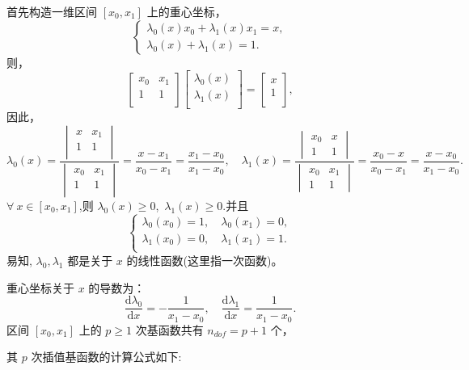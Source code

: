 \documentclass[12pt,a4paper]{article}
\begin{document}
首先构造一维区间 $[x_0,x_1]$ 上的重心坐标，
$$
\begin{cases}
\lambda _0(x)x_0+\lambda _1(x)x_1=x,\\
\lambda _0(x)+\lambda _1(x)=1.
\end{cases}
$$
则，
$$
\begin{bmatrix}
x_0 & x_1\\
1 & 1\\
\end{bmatrix}
\begin{bmatrix}
\lambda _0(x)\\
\lambda _1(x)\\
\end{bmatrix}=\begin{bmatrix}
x\\
1\\
\end{bmatrix},
$$
因此，
$$
\lambda _0(x)=\frac{\begin{vmatrix}
x & x_1 \\
1 & 1 \\
\end{vmatrix}}{\begin{vmatrix}
x_0 & x_1 \\
1 & 1 \\
\end{vmatrix}}=\frac{x-x_1}{x_0-x_1}=\frac{x_1-x_0}{x_1-x_0},
\quad\lambda _1(x)=\frac{\begin{vmatrix}
x_0 & x \\
1 & 1
\end{vmatrix}}{\begin{vmatrix}
x_0 & x_1 \\
1 & 1
\end{vmatrix}}=\frac{x_0-x}{x_0-x_1}=\frac{x-x_0}{x_1-x_0}.
$$
$\forall ~x\in [x_0,x_1]$,则 $\lambda _0(x)\ge 0$,~$\lambda _1(x)\ge 0$.并且
$$
\begin{cases}
\lambda _0 (x_0)=1,\quad\lambda _0 (x_1)=0,\\
\lambda _1 (x_0)=0,\quad\lambda _1 (x_1)=1.\\
\end{cases}
$$
易知, $\lambda_0, \lambda_1$ 都是关于 $x$ 的线性函数(这里指一次函数)。

重心坐标关于 $x$ 的导数为：
$$
\frac{\mathrm d \lambda_0}{\mathrm dx} = -\frac{1}{x_1 - x_0},\quad 
\frac{\mathrm d \lambda_1}{\mathrm dx} = \frac{1}{x_1 - x_0}.
$$
区间 $[x_0, x_1]$ 上的 $p\geq 1$ 次基函数共有 
$n_{dof} = p+1$ 个，

其 $p$ 次插值基函数的计算公式如下:
\end{document}

